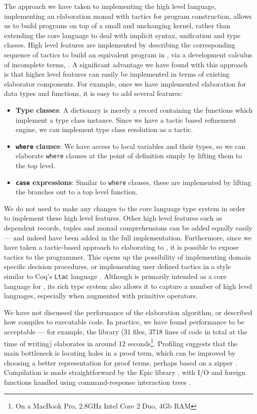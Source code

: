 The approach we have taken to implementing the high level language,
implementing an elaboration monad with tactics for program construction, allows
us to build programs on top of a small and unchanging kernel, rather than
extending the core language to deal with implicit syntax, unification and type
classes.  High level \Idris{} features are implemented by describing the
corresponding sequence of tactics to build an equivalent program in \TT{}, via
a development calculus of incomplete terms, \TTdev{}. A significant advantage
we have found with this approach is that higher level features can easily be
implemented in terms of existing elaborator components. For example, once we
have implemented elaboration for data types and functions, it is easy to add
several features:

\begin{itemize}
\item \textbf{Type classes}: A dictionary is merely a record containing the
functions which implement a type class instance. Since we have a tactic based
refinement engine, we can implement type class resolution as a tactic.
\item \textbf{\texttt{where} clauses}: We have access to local variables and
their types, so we can
elaborate \texttt{where} clauses at the point of definition simply by lifting
them to the top level. 
\item \textbf{\texttt{case} expressions}: Similar to \texttt{where} clauses,
these are implemented by lifting the branches out to a top level function.
\end{itemize}

We do not need to make any changes to the core language type system in order to 
implement these high level features. 
Other high level features such as dependent records, tuples and monad comprehensions
can be added equally easily --- and indeed have been added in the full implementation.  
Furthermore, 
since we have taken a tactic-based approach to elaborating \Idris{} to \TT{},
it is possible to expose tactics to the programmer. This opens up
the possibility of implementing domain specific decision procedures, or
implementing user defined tactics in a style similar to Coq's \texttt{Ltac}
language \cite{Delahaye2000}.  Although \TT{} is primarily intended as a core
language for \Idris{}, its rich type system also allows it to capture a number
of high level languages, especially when augmented with primitive operators. 

We have not discussed the performance of the elaboration
algorithm, or described how \Idris{} compiles to executable code. In practice,
we have found performance to be acceptable --- for example, the \Idris{}
library (31 files, 3718 lines of code in total at the time of writing)
elaborates in around 12 seconds\footnote{On a MacBook Pro, 2.8GHz Intel Core 2
Duo, 4Gb RAM}. Profiling suggests that the main bottleneck is locating holes
in a proof term, which can be improved by choosing a better representation
for proof terms, perhaps based on a zipper \cite{Huet1997}. Compilation is made
straightforward by the Epic library \cite{brady2011epic}, with I/O and foreign
functions handled using command-response interaction trees \cite{Hancock2000}.

